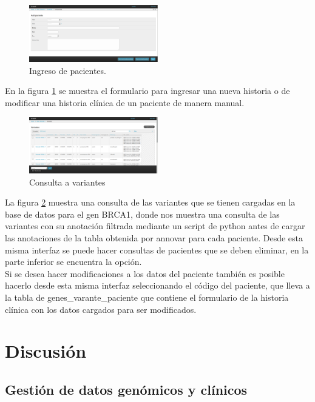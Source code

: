 \begin{figure}[h] 
	\centering
	\includegraphics[width=0.5\textwidth]{Kap3/ingresar_paciente}
	\caption{Ingreso de pacientes.} \label{fig:pacientes}
\end{figure}

En la figura \ref{fig:pacientes} se muestra el formulario para ingresar una nueva historia o de modificar una historia clínica de un paciente de manera manual.

\begin{figure}[h] 
	\centering
	\includegraphics[width=0.5\textwidth]{Kap3/consulta}
	\caption{Consulta a variantes} \label{fig:consulta}
\end{figure}


La figura \ref{fig:consulta} muestra una consulta de las variantes que se tienen cargadas en la base de datos para el gen BRCA1, donde nos muestra una consulta de las variantes con su anotación  filtrada mediante un script de python antes de cargar las anotaciones de la tabla obtenida por annovar para cada paciente. Desde esta misma interfaz se puede hacer consultas de pacientes que se deben eliminar, en la parte inferior se encuentra la opción.\\

Si se desea hacer modificaciones a los datos del paciente también es posible hacerlo desde esta misma interfaz seleccionando el código del paciente, que lleva a la tabla de genes\_varante\_paciente que contiene el formulario de la historia clínica con los datos cargados para ser modificados. 



\section{Discusión}

\subsection*{Gestión de datos genómicos y clínicos}

